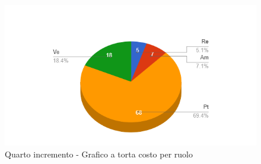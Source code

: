 {{\begin{longtable}{C{.4\freewidth} C{.2\freewidth} C{.2\freewidth} C{.2\freewidth} C{.2\freewidth} C{.2\freewidth} C{.2\freewidth} C{.2\freewidth} C{.2\freewidth}}
        \end{longtable}
        \begin{figure}[H]
          \includegraphics[width=15cm]{sezioni/Images/quartoT.png}
          \centering
          \caption{Quarto incremento - Grafico a torta costo per ruolo}
       \end{figure}
    }
    }

